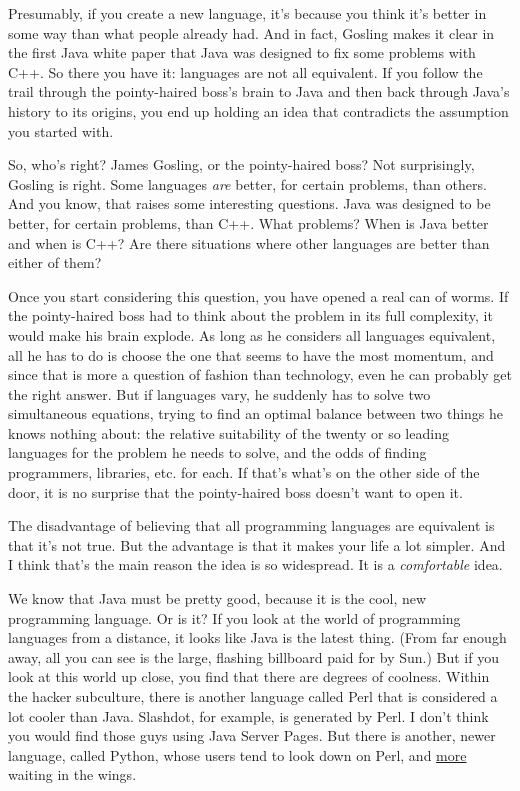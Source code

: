 Presumably, if you create a new language, it's because you think it's
better in some way than what people already had. And in fact, Gosling
makes it clear in the first Java white paper that Java was designed to
fix some problems with C++. So there you have it: languages are not all
equivalent. If you follow the trail through the pointy-haired boss's
brain to Java and then back through Java's history to its origins, you
end up holding an idea that contradicts the assumption you started with.

So, who's right? James Gosling, or the pointy-haired boss? Not
surprisingly, Gosling is right. Some languages \emph{are} better, for
certain problems, than others. And you know, that raises some
interesting questions. Java was designed to be better, for certain
problems, than C++. What problems? When is Java better and when is C++?
Are there situations where other languages are better than either of
them?

Once you start considering this question, you have opened a real can of
worms. If the pointy-haired boss had to think about the problem in its
full complexity, it would make his brain explode. As long as he
considers all languages equivalent, all he has to do is choose the one
that seems to have the most momentum, and since that is more a question
of fashion than technology, even he can probably get the right answer.
But if languages vary, he suddenly has to solve two simultaneous
equations, trying to find an optimal balance between two things he knows
nothing about: the relative suitability of the twenty or so leading
languages for the problem he needs to solve, and the odds of finding
programmers, libraries, etc. for each. If that's what's on the other
side of the door, it is no surprise that the pointy-haired boss doesn't
want to open it.

The disadvantage of believing that all programming languages are
equivalent is that it's not true. But the advantage is that it makes
your life a lot simpler. And I think that's the main reason the idea is
so widespread. It is a \emph{comfortable} idea.

We know that Java must be pretty good, because it is the cool, new
programming language. Or is it? If you look at the world of programming
languages from a distance, it looks like Java is the latest thing. (From
far enough away, all you can see is the large, flashing billboard paid
for by Sun.) But if you look at this world up close, you find that there
are degrees of coolness. Within the hacker subculture, there is another
language called Perl that is considered a lot cooler than Java.
Slashdot, for example, is generated by Perl. I don't think you would
find those guys using Java Server Pages. But there is another, newer
language, called Python, whose users tend to look down on Perl, and
\href{accgen.html}{more} waiting in the wings.

